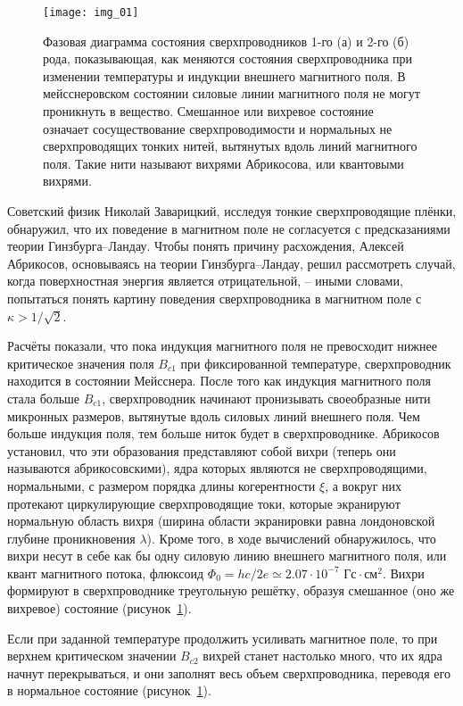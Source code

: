 \begin{figure}[h!]
    \center
    \texttt{[image: img\_01]}
    \caption{Фазовая диаграмма состояния сверхпроводников 1-го (а) и 
        2-го (б) рода, показывающая, как меняются состояния сверхпроводника 
        при изменении температуры и индукции внешнего магнитного поля. В 
        мейсснеровском состоянии силовые линии магнитного поля не могут 
        проникнуть в вещество. Смешанное или вихревое состояние означает 
        сосуществование сверхпроводимости и нормальных не сверхпроводящих 
        тонких нитей, вытянутых вдоль линий магнитного поля. Такие нити 
        называют вихрями Абрикосова, или квантовыми вихрями.}
    \label{img:01}
\end{figure}

Советский физик Николай Заварицкий, исследуя тонкие сверхпроводящие плёнки, 
обнаружил, что их поведение в магнитном поле не согласуется с предсказаниями 
теории Гинзбурга–Ландау. Чтобы понять причину расхождения, Алексей Абрикосов, 
основываясь на теории Гинзбурга–Ландау, решил рассмотреть случай, когда 
поверхностная энергия является отрицательной, -- иными словами, попытаться 
понять картину поведения сверхпроводника в магнитном поле с 
\( \kappa > 1/\sqrt{2} \).

Расчёты показали, что пока индукция магнитного поля не превосходит нижнее 
критическое значения поля \( B_{c1} \) при фиксированной температуре, 
сверхпроводник находится в состоянии Мейсснера. После того как индукция 
магнитного поля стала больше \( B_{c1} \), сверхпроводник начинают пронизывать 
своеобразные нити микронных размеров, вытянутые вдоль силовых линий внешнего 
поля. Чем больше индукция поля, тем больше ниток будет в сверхпроводнике. 
Абрикосов установил, что эти образования представляют собой вихри (теперь они 
называются абрикосовскими), ядра которых являются не сверхпроводящими, 
нормальными, с размером порядка длины когерентности \( \xi \), а вокруг них 
протекают циркулирующие сверхпроводящие токи, которые экранируют нормальную 
область вихря (ширина области экранировки равна лондоновской глубине 
проникновения \( \lambda \)). Кроме того, в ходе вычислений обнаружилось, что 
вихри несут в себе как бы одну силовую линию внешнего магнитного поля, или 
квант магнитного потока, флюксоид 
\( \Phi_0 = hc/2e \simeq 2.07\cdot10^{-7} \text{ Гс}\cdot\text{см}^2 \). Вихри 
формируют в сверхпроводнике треугольную решётку, образуя смешанное (оно же 
вихревое) состояние (рисунок~\ref{img:01}).

Если при заданной температуре продолжить усиливать магнитное поле, то при 
верхнем критическом значении \( B_{c2} \) вихрей станет настолько много, что 
их ядра начнут перекрываться, и они заполнят весь объем сверхпроводника, 
переводя его в нормальное состояние (рисунок~\ref{img:01}). \cite{bib:net}

